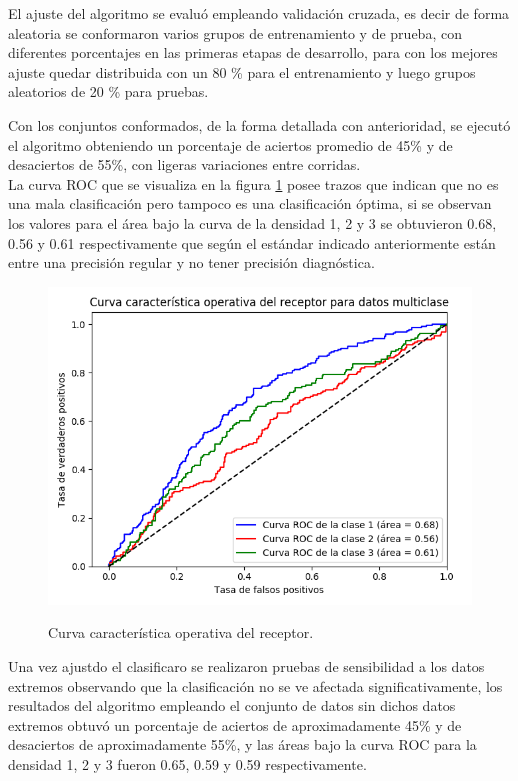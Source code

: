 El ajuste del algoritmo se evaluó empleando validación cruzada, es decir de forma aleatoria se conformaron varios grupos de entrenamiento y de prueba, con diferentes porcentajes en las primeras etapas de desarrollo, para con los mejores ajuste quedar distribuida con un 80 \% para el entrenamiento y luego grupos aleatorios de 20 \% para pruebas.

Con los conjuntos conformados, de la forma detallada con anterioridad, se ejecutó el algoritmo obteniendo  un porcentaje de aciertos promedio de  45\% y de desaciertos de 55\%, con ligeras variaciones entre corridas.\\

La curva ROC que se visualiza en la figura \ref{fig:roc} posee trazos que indican que no es una mala clasificación pero tampoco es una clasificación óptima, si se observan los valores para el área bajo la curva de la densidad 1, 2 y 3
se obtuvieron 0.68, 0.56 y 0.61 respectivamente que según el estándar indicado anteriormente
están entre una precisión regular y no tener precisión diagnóstica.\\
\clearpage

\begin{figure}[h!]
	\caption{Curva característica operativa del receptor.}
	\centering
	\includegraphics[scale=0.6]{roc.png}
	\label{fig:roc}
\end{figure}

Una vez ajustdo el clasificaro se realizaron pruebas de sensibilidad a los datos extremos observando que la clasificación no se ve afectada significativamente, los resultados del algoritmo empleando el conjunto de datos sin dichos datos extremos obtuvó un porcentaje de aciertos de aproximadamente 45\% y de desaciertos de aproximadamente 55\%, y las áreas bajo la curva ROC para la densidad 1, 2 y 3 fueron 0.65, 0.59 y 0.59 respectivamente.\\

